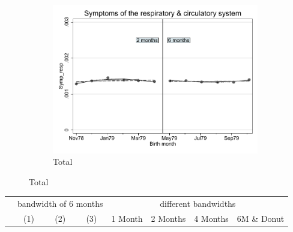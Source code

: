 \documentclass[a4paper ]{article}
\begin{document}
\newpage
\begin{figure}[h]
	\centering
	\begin{subfigure}[t]{0.5\textwidth}
		\centering
		\includegraphics[width=0.99\textwidth]{R1_RD_Symp_resp_fits}
		\caption{Total}		
	\end{subfigure}
\end{figure}


\begin{table}[h]\centering
\def\sym#1{\ifmmode^{#1}\else\(^{#1}\)\fi}
\begin{tabular}{l*{3}{c}|cccc}
\toprule
&\multicolumn{3}{c}{bandwidth of 6 months} & \multicolumn{4}{c}{different bandwidths} \\
 \cmidrule(lr{1em}){2-4} \cmidrule(lr{1em}){5-8}
 &\multicolumn{1}{c}{(1)}&\multicolumn{1}{c}{(2)}&\multicolumn{1}{c}{(3)}& 1 Month & 2 Months & 4 Months & 6M \& Donut \\
\midrule 

\bottomrule
\end{tabular}
\end{table}
\end{document}
